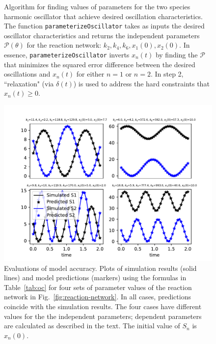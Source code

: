 \documentclass{bmcart}
\newcommand{\fig}[1]{Fig.~\ref{#1}}
\newcommand{\tab}[1]{Table~\ref{#1}}
\begin{document}
\begin{backmatter}
\begin{figure}
\caption{Algorithm for finding values of parameters for the two species harmonic oscillator that achieve desired oscillation characteristics. The function {\tt parameterizeOscillator} takes
as inputs the desired oscillator characteristics and returns the independent parameters $\mathcal{P} (\theta)$ for
the reaction network: $k_2, k_4, k_6, x_1(0), x_2(0)$.
In essence, {\tt parameterizeOscillator}
inverts $x_n (t)$ by finding the $\mathcal{P}$ that minimizes
the squared error difference between the desired oscillations and $x_n (t)$ for either
$n=1$ or $n=2$.
In step 2, ``relaxation" (via $\delta (t)$) 
is used to address the hard constraints that $x_n (t) \geq 0$.}
\label{fig:design-oscillator}
\end{figure}

\begin{figure}
        \centering
\includegraphics[scale=0.75]{figures/Figure_3.pdf}
         \caption{Evaluations of model accuracy.
         Plots of simulation results (solid lines)
         and model predictions (markers) using the formulas in \tab{tab:oc} for four sets of parameter values of
         the reaction network in \fig{fig:reaction-network}.
         In all cases, predictions coincide with the simulation results.
         The four cases have different values for the
         the independent parameters; dependent parameters are calculated as described in the text.
         The initial value of $S_n$ is $x_n (0)$.}
         \label{fig:model-evaluation}
\end{figure}



\end{backmatter}
\end{document}
